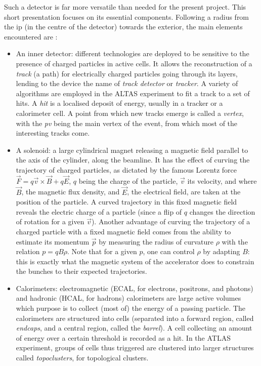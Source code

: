 Such a detector is far more versatile than needed for the present project. This short presentation focuses on its essential components. Following a radius from the \gls{ip} (in the centre of the detector) towards the exterior, the main elements encountered are \cite{AtlasInstruDec}:
\begin{itemize}
\item An inner detector: different technologies are deployed to be sensitive to the presence of charged particles in active cells. It allows the reconstruction of a \textit{track} (a path) for electrically charged particles going through its layers, lending to the device the name of \textit{track detector} or \textit{tracker}. A variety of algorithms are employed in the ALTAS experiment to fit a track to a set of hits. A \textit{hit} is a localised deposit of energy, usually in a tracker or a calorimeter cell. A point from which new tracks emerge is called a \textit{vertex}, with the \textit{\gls{pv}} being the main vertex of the event, from which most of the interesting tracks come. 
\item A solenoid: a large cylindrical magnet releasing a magnetic field parallel to the axis of the cylinder, along the beamline. It has the effect of curving the trajectory of charged particles, as dictated by the famous Lorentz force $\vec{F} = q \vec{v} \times \vec{B} + q \vec{E}$, $q$ being the charge of the particle, $\vec{v}$ its velocity, and where $\vec{B}$, the magnetic flux density, and $\vec{E}$, the electrical field, are taken at the position of the particle. A curved trajectory in this fixed magnetic field reveals the electric charge of a particle (since a flip of $q$ changes the direction of rotation for a given $\vec{v}$). Another advantage of curving the trajectory of a charged particle with a fixed magnetic field comes from the ability to estimate its momentum $\vec{p}$ by measuring the radius of curvature $\rho$ with the relation $p = qB \rho$. Note that for a given $p$, one can control $\rho$ by adapting $B$: this is exactly what the magnetic system of the accelerator does to constrain the bunches to their expected trajectories. 
\item Calorimeters: electromagnetic (ECAL, for electrons, positrons, and photons) and hadronic (HCAL, for hadrons) calorimeters are large active volumes which purpose is to collect (most of) the energy of a passing particle. The calorimeters are structured into cells (separated into a forward region, called \textit{endcaps}, and a central region, called the \textit{barrel}). A cell collecting an amount of energy over a certain threshold is recorded as a hit. In the ATLAS experiment, groups of cells thus triggered are clustered into larger structures called \textit{topoclusters}, for topological clusters.
\end{itemize}

